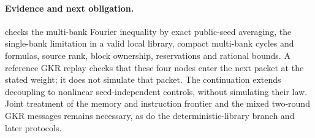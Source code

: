 \documentclass[11pt]{article}
\begin{document}
\paragraph{Evidence and next obligation.}  checks the multi-bank Fourier inequality by exact public-seed averaging, the single-bank limitation in a valid local library, compact multi-bank cycles and formulas, source rank, block ownership, reservations and rational bounds. A reference GKR replay checks that these four nodes enter the next packet at the stated weight; it does not simulate that packet. The continuation  extends decoupling to nonlinear seed-independent controls, without simulating their law. Joint treatment of the memory and instruction frontier and the mixed two-round GKR messages remains necessary, as do the deterministic-library branch and later protocols.
\end{document}

